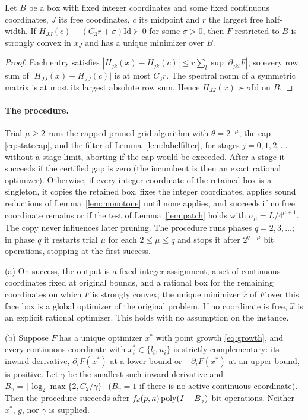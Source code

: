 \begin{lemma}\label{lem:patch}
Let $B$ be a box with fixed integer coordinates and some fixed continuous
coordinates, $J$ its free coordinates, $c$ its midpoint and $r$ the largest
free half-width. If $H_{JJ}(c)-(C_3r+\sigma)\mathrm{Id}\succ0$ for some
$\sigma>0$, then $F$ restricted to $B$ is strongly convex in $x_J$ and has a
unique minimizer over $B$.
\end{lemma}

\begin{proof}
Each entry satisfies $|H_{jk}(x)-H_{jk}(c)|\le r\sum_l\sup|\partial_{jkl}F|$,
so every row sum of $|H_{JJ}(x)-H_{JJ}(c)|$ is at most $C_3r$. The spectral
norm of a symmetric matrix is at most its largest absolute row sum. Hence
$H_{JJ}(x)\succ\sigma\mathrm{Id}$ on $B$.
\end{proof}

\paragraph{The procedure.}
Trial $\mu\ge2$ runs the capped pruned-grid algorithm with $\theta=2^{-\mu}$,
the cap \eqref{eq:statecap}, and the filter of Lemma~\ref{lem:labelfilter},
for stages $j=0,1,2,\ldots$ without a stage limit, aborting if the cap would be
exceeded. After a stage it succeeds if the certified gap is zero (the
incumbent is then an exact rational optimizer). Otherwise, if every integer
coordinate of the retained box is a singleton, it copies the retained box,
fixes the integer coordinates, applies sound reductions of
Lemma~\ref{lem:monotone} until none applies, and succeeds if no free
coordinate remains or if the test of Lemma~\ref{lem:patch} holds with
$\sigma_\mu=L/4^{\mu+1}$. The copy never influences later pruning. The
procedure runs phases $q=2,3,\ldots$; in phase $q$ it restarts trial $\mu$ for
each $2\le\mu\le q$ and stops it after $2^{q-\mu}$ bit operations, stopping at
the first success.

\begin{theorem}\label{thm:boundary}
(a) On success, the output is a fixed integer assignment, a set of continuous
coordinates fixed at original bounds, and a rational box for the remaining
coordinates on which $F$ is strongly convex; the unique minimizer $\hat x$ of
$F$ over this face box is a global optimizer of the original problem. If no
coordinate is free, $\hat x$ is an explicit rational optimizer. This holds
with no assumption on the instance.

(b) Suppose $F$ has a unique optimizer $x^*$ with point growth
\eqref{eq:growth}, and every continuous coordinate with $x^*_i\in\{l_i,u_i\}$
is strictly complementary: its inward derivative, $\partial_iF(x^*)$ at a
lower bound or $-\partial_iF(x^*)$ at an upper bound, is positive. Let
$\gamma$ be the smallest such inward derivative and
$B_\gamma=\lceil\log_2\max\{2,C_2/\gamma\}\rceil$ ($B_\gamma=1$ if there is
no active continuous coordinate). Then the procedure succeeds after
$f_d(p,\kappa)\operatorname{poly}(I+B_\gamma)$ bit operations. Neither $x^*$, $g$, nor
$\gamma$ is supplied.
\end{theorem}

